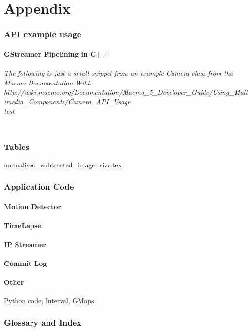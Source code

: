 \documentclass[11pt]{article} %
\begin{document}
\part{Appendix}
\section{API example usage}
\subsection{GStreamer Pipelining in C++}
\paragraph{ The following is just a small snippet from an example Camera class from the Maemo Documentation Wiki:\\http://wiki.maemo.org/Documentation/Maemo\_5\_Developer\_Guide/Using\_Multimedia\_Components/Camera\_API\_Usage
\\ test\\\\}


\section{Tables}
{normalised_subtracted_image_size.tex}


\section{Application Code}
\subsection{Motion Detector}
\subsection{TimeLapse}
\subsection{IP Streamer}
\subsection{Commit Log}
\subsection{Other}{Python code, Interval, GMaps}

\section{Glossary and Index}
\end{document}
